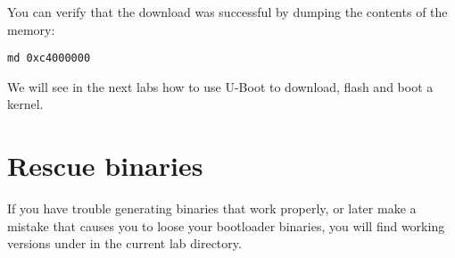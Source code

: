 You can verify that the download was successful by dumping the
contents of the memory:

\begin{verbatim}
md 0xc4000000
\end{verbatim}

We will see in the next labs how to use U-Boot to download, flash and
boot a kernel.

\section{Rescue binaries}

If you have trouble generating binaries that work properly, or later
make a mistake that causes you to loose your bootloader binaries, you
will find working versions under  in the current lab
directory.
